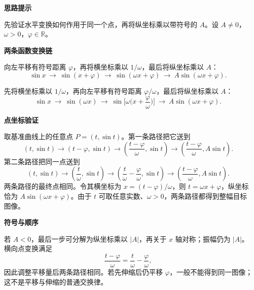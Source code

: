 \begin{proofbox}
	\textbf{\textcolor{CProof}{思路提示}}

	先验证水平变换如何作用于同一个点，再将纵坐标乘以带符号的 $A$。设 $A\neq0$，$\omega>0$，$\varphi\in\mathbb R$。

	\medskip
	\textbf{\textcolor{CProof}{两条函数变换链}}
	\begin{description}[style=nextline, leftmargin=2.8em, labelsep=0.5em, itemsep=0.55em]
		\item[\textbf{先移后缩：}] 向左平移有符号距离 $\varphi$，再将横坐标乘以 $1/\omega$，最后将纵坐标乘以 $A$：
			\[
				\sin x\ \longrightarrow\ \sin(x+\varphi)
				\ \longrightarrow\ \sin(\omega x+\varphi)
				\ \longrightarrow\ A\sin(\omega x+\varphi).
			\]
		\item[\textbf{先缩后移：}] 先将横坐标乘以 $1/\omega$，再向左平移有符号距离 $\varphi/\omega$，最后将纵坐标乘以 $A$：
			\[
				\sin x\ \longrightarrow\ \sin(\omega x)
				\ \longrightarrow\ \sin\!\Big[\omega\Big(x+\frac{\varphi}{\omega}\Big)\Big]
				\ \longrightarrow\ A\sin(\omega x+\varphi).
			\]
	\end{description}

	\medskip
	\textbf{\textcolor{CProof}{点坐标验证}}

	取基准曲线上的任意点 $P=(t,\sin t)$。第一条路径把它送到
	\[
		(t,\sin t)\longrightarrow(t-\varphi,\sin t)
		\longrightarrow\left(\frac{t-\varphi}{\omega},\sin t\right)
		\longrightarrow\left(\frac{t-\varphi}{\omega},A\sin t\right).
	\]
	第二条路径把同一点送到
	\[
		(t,\sin t)\longrightarrow\left(\frac{t}{\omega},\sin t\right)
		\longrightarrow\left(\frac{t}{\omega}-\frac{\varphi}{\omega},\sin t\right)
		\longrightarrow\left(\frac{t-\varphi}{\omega},A\sin t\right).
	\]
	两条路径的最终点相同。令其横坐标为 $x=(t-\varphi)/\omega$，则 $t=\omega x+\varphi$，纵坐标恰为 $A\sin(\omega x+\varphi)$。由于 $t$ 可取任意实数、$\omega>0$，两条路径都得到整幅目标图像。

	\medskip
	\textbf{\textcolor{CProof}{符号与顺序}}

	若 $A<0$，最后一步可分解为纵坐标乘以 $|A|$，再关于 $x$ 轴对称；振幅仍为 $|A|$。横向点变换满足
	\[
		\frac{t-\varphi}{\omega}=
		\frac{t}{\omega}-\frac{\varphi}{\omega},
	\]
	因此调整平移量后两条路径相同。若先伸缩后仍平移 $\varphi$，一般不能得到同一图像；这不是平移与伸缩的普通交换律。
\end{proofbox}
